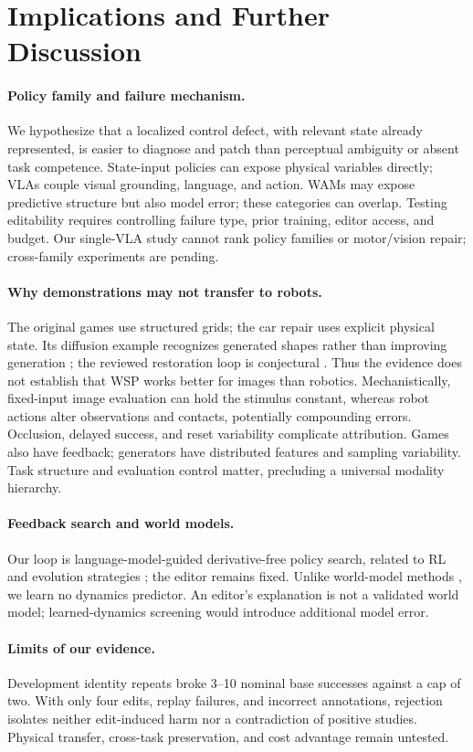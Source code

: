 \section{Implications and Further Discussion}
\paragraph{Policy family and failure mechanism.}
We hypothesize that a localized control defect, with relevant state already represented, is easier to diagnose and patch than perceptual ambiguity or absent task competence. State-input policies can expose physical variables directly; VLAs couple visual grounding, language, and action. WAMs may expose predictive structure but also model error; these categories can overlap. Testing editability requires controlling failure type, prior training, editor access, and budget. Our single-VLA study cannot rank policy families or motor/vision repair; cross-family experiments are pending.

\paragraph{Why demonstrations may not transfer to robots.}
The original games use structured grids; the car repair uses explicit physical state. Its diffusion example recognizes generated shapes rather than improving generation \citep{takehi2026sparks}; the reviewed restoration loop is conjectural \citep{zheng2026}. Thus the evidence does not establish that WSP works better for images than robotics. Mechanistically, fixed-input image evaluation can hold the stimulus constant, whereas robot actions alter observations and contacts, potentially compounding errors. Occlusion, delayed success, and reset variability complicate attribution. Games also have feedback; generators have distributed features and sampling variability. Task structure and evaluation control matter, precluding a universal modality hierarchy.

\paragraph{Feedback search and world models.}
Our loop is language-model-guided derivative-free policy search, related to RL and evolution strategies \citep{salimans2017es}; the editor remains fixed. Unlike world-model methods \citep{ha2018world,hafner2020dreamer}, we learn no dynamics predictor. An editor's explanation is not a validated world model; learned-dynamics screening would introduce additional model error.

\paragraph{Limits of our evidence.}
Development identity repeats broke 3--10 nominal base successes against a cap of two. With only four edits, replay failures, and incorrect annotations, rejection isolates neither edit-induced harm nor a contradiction of positive studies. Physical transfer, cross-task preservation, and cost advantage remain untested.
